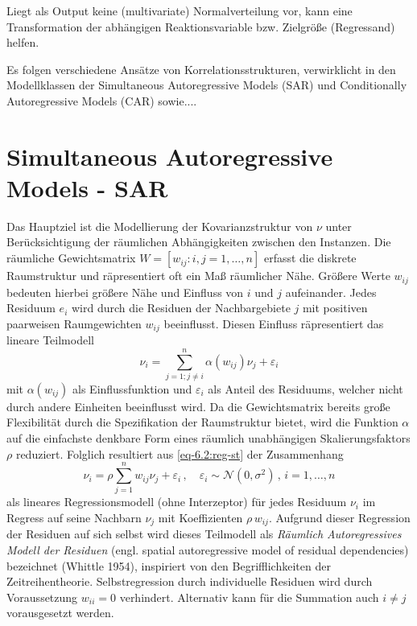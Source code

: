 Liegt als Output keine (multivariate) Normalverteilung vor, kann eine Transformation der 
abhängigen Reaktionsvariable bzw. Zielgröße (Regressand) helfen. 

Es folgen verschiedene Ansätze von Korrelationsstrukturen, verwirklicht in den Modellklassen 
der Simultaneous Autoregressive Models (SAR) und Conditionally Autoregressive Models (CAR) sowie....

\section{Simultaneous Autoregressive Models - SAR}

Das Hauptziel ist die Modellierung der Kovarianzstruktur von $\nu$ unter Berücksichtigung der 
räumlichen Abhängigkeiten zwischen den Instanzen.
Die räumliche Gewichtsmatrix $W=[w_{ij}:i,j=1,\ldots,n]$ 
erfasst die diskrete Raumstruktur und räpresentiert oft ein Maß räumlicher Nähe. Größere Werte $w_{ij}$ 
bedeuten hierbei größere Nähe und Einfluss von $i$ und $j$ aufeinander. Jedes Residuum $e_{i}$ wird 
durch die Residuen der Nachbargebiete $j$ mit positiven paarweisen Raumgewichten $w_{ij}$ beeinflusst. 
Diesen Einfluss räpresentiert das lineare Teilmodell
\begin{equation} \label{eq-6.2:reg-st}
    \nu_{i}=\sum_{j=1 ; j \neq i}^{n} \alpha(w_{ij}) \nu_{j} + \varepsilon_{i}
\end{equation}   
mit $\alpha(w_{ij})$ als Einflussfunktion und $\varepsilon_{i}$ als Anteil des Residuums, welcher 
nicht durch andere Einheiten beeinflusst wird. Da die Gewichtsmatrix bereits große Flexibilität durch 
die Spezifikation der Raumstruktur bietet, wird die Funktion $\alpha$ auf die einfachste 
denkbare Form eines räumlich unabhängigen Skalierungsfaktors $\rho$ reduziert.
Folglich resultiert aus \eqref{eq-6.2:reg-st} der Zusammenhang
\begin{equation}\label{eq-6.3:reg-err}
    \nu_{i}=\rho \sum_{j = 1}^{n} w_{ij} \nu_{j} + \varepsilon_{i} \, , \quad 
    \varepsilon_{i} \sim \mathcal{N}(0,\sigma^{2}) \, , \, i= 1,\ldots,n
\end{equation}
als lineares Regressionsmodell (ohne Interzeptor) für jedes Residuum $\nu_{i}$ im Regress auf 
seine Nachbarn $\nu_{j}$ mit Koeffizienten $\rho \, w_{ij}$. Aufgrund dieser Regression der 
Residuen auf \glqq sich selbst \grqq{} wird dieses Teilmodell 
als \emph{Räumlich Autoregressives Modell der Residuen} 
(engl. spatial autoregressive model of residual dependencies) 
bezeichnet (Whittle 1954), inspiriert von den Begrifflichkeiten der Zeitreihentheorie. 
Selbstregression durch individuelle Residuen wird durch Voraussetzung $w_{ii}=0$ verhindert. Alternativ kann für die 
Summation auch $i \neq j$ vorausgesetzt werden.

